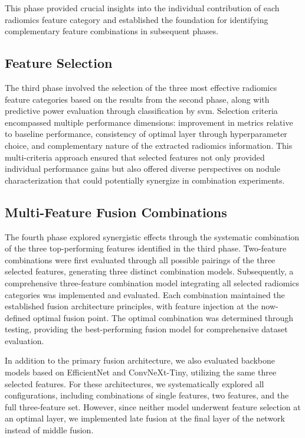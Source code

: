 This phase provided crucial insights into the individual contribution of each radiomics feature category and established the foundation for identifying complementary feature combinations in subsequent phases.

\subsection{Feature Selection}
The third phase involved the selection of the three most effective radiomics feature categories based on the results from the second phase, along with predictive power evaluation through classification by \ac{svm}. Selection criteria encompassed multiple performance dimensions: improvement in metrics relative to baseline performance, consistency of optimal layer through hyperparameter choice, and complementary nature of the extracted radiomics information. This multi-criteria approach ensured that selected features not only provided individual performance gains but also offered diverse perspectives on nodule characterization that could potentially synergize in combination experiments.

\subsection{Multi-Feature Fusion Combinations}
The fourth phase explored synergistic effects through the systematic combination of the three top-performing features identified in the third phase. Two-feature combinations were first evaluated through all possible pairings of the three selected features, generating three distinct combination models. Subsequently, a comprehensive three-feature combination model integrating all selected radiomics categories was implemented and evaluated. Each combination maintained the established fusion architecture principles, with feature injection at the now-defined optimal fusion point. The optimal combination was determined through testing, providing the best-performing fusion model for comprehensive dataset evaluation.

In addition to the primary fusion architecture, we also evaluated backbone models based on EfficientNet and ConvNeXt-Tiny, utilizing the same three selected features. For these architectures, we systematically explored all configurations, including combinations of single features, two features, and the full three-feature set. 
However, since neither model underwent feature selection at an optimal layer, we implemented late fusion at the final layer of the network instead of middle fusion.

